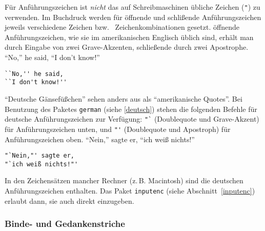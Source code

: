 Für Anführungszeichen ist \emph{nicht} das auf Schreibmaschinen
übliche Zeichen (\verb|"|) zu verwenden.
Im Buchdruck werden für öffnende und schlißende
Anführungszeichen jeweils verschiedene Zeichen bzw.\ %
Zeichenkombinationen gesetzt.
öffnende Anführungszeichen, wie sie im amerikanischen Englisch 
üblich sind, erhält man durch Eingabe von zwei Grave-Akzenten, 
schließende durch zwei Apostrophe.
\exa
``No,'' he said,
``I don't know!''
\exb
\begin{verbatim}
``No,'' he said,
``I don't know!''
\end{verbatim}
\exc
"`Deutsche Gänsefüßchen"' sehen anders aus als ``amerikanische
Quotes''.  
Bei Benutzung des Paketes \texttt{german} (siehe \ref{deutsch})
stehen die folgenden Befehle für 
deutsche Anführungszeichen zur Verfügung:
\verb|"`| (Doublequote und Grave-Akzent) für Anführungszeichen
unten,
und
\verb|"'| (Doublequote und Apostroph) für Anführungszeichen oben.
\exa
"`Nein,"' sagte er,
"`ich weiß nichts!"'
\exb
\begin{verbatim}
"`Nein,"' sagte er,
"`ich weiß nichts!"'
\end{verbatim}
\exc
In den Zeichensätzen mancher Rechner (z.\,B. Macintosh) sind die deutschen 
Anführungszeichen enthalten.  Das Paket \texttt{inputenc} (siehe
Abschnitt~\ref{inputenc}) erlaubt dann, sie auch direkt einzugeben.


\subsubsection{Binde- und Gedankenstriche}
 
